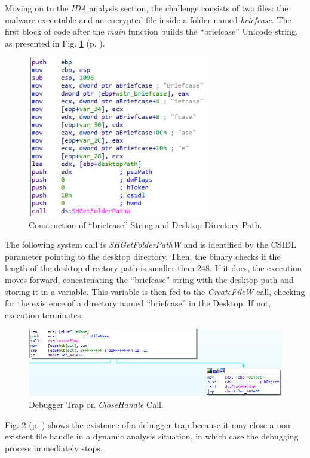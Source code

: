 Moving on to the \textit{IDA} analysis section, the challenge consists of two files: the malware executable and an encrypted file inside a folder named \textit{briefcase}. The first block of code after the \textit{main} function builds the ``briefcase'' Unicode string, as presented in Fig. \ref{fig:ida_1} (p. \pageref{fig:ida_1}).

\begin{figure}[H]
    \includegraphics[width=8cm]{figures/ida_1.png}
    \caption{Construction of ``briefcase'' String and Desktop Directory Path.}
    \label{fig:ida_1}
\end{figure}

The following system call is \textit{SHGetFolderPathW} and is identified by the CSIDL parameter pointing to the desktop directory. Then, the binary checks if the length of the desktop directory path is smaller than 248. If it does, the execution moves forward, concatenating the ``briefcase'' string with the desktop path and storing it in a variable. This variable is then fed to the \textit{CreateFileW} call, checking for the existence of a directory named ``briefcase'' in the Desktop. If not, execution terminates. 

\begin{figure}[H]
    \includegraphics[width=12cm]{figures/ida_2.png}
    \caption{Debugger Trap on \textit{CloseHandle} Call.}
    \label{fig:ida_2}
\end{figure}

Fig. \ref{fig:ida_2} (p. \pageref{fig:ida_2}) shows the existence of a debugger trap because it may close a non-existent file handle in a dynamic analysis situation, in which case the debugging process immediately stops.

